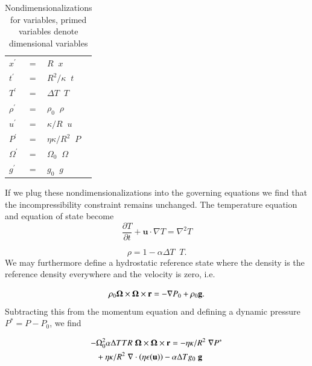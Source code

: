 \documentclass[preprint,12pt,authoryear]{elsarticle}
\newcommand{\mitbf}[1]{\hbox{\mathversion{bold}$#1$}}
\begin{document}
\begin{table}
\centering
\caption{Nondimensionalizations for variables, primed variables denote dimensional variables}
\label{tab:nondim_convert}
\begin{tabular}{@{}lll}
$x^\prime$ &=& $R \;\; x$ \\
$t^\prime$ &=& $R^2/\kappa \;\; t$ \\
$T^\prime$ &=& $\Delta T \;\; T$ \\
$\rho^\prime$ &=& $\rho_0 \;\; \rho$\\
$u^\prime$ &=& $\kappa/R \;\; u$ \\
$P^\prime$ &=& $\eta \kappa/R^2 \;\; P$ \\
$\Omega^\prime$ &=& $\Omega_0 \;\; \Omega$ \\
$g^\prime$ &=& $g_0 \;\; g$
\end{tabular}
\end{table}

If we plug these nondimensionalizations into the governing equations we find that the incompressibility constraint remains unchanged.  
The temperature equation and equation of state become
\begin{equation}
\frac{\partial T}{\partial t} + \mathbf{u} \cdot \nabla T = \nabla^2 T
\end{equation}

\begin{equation}
\rho = 1 - \alpha \Delta T \;\;  T.
\end{equation}
We may furthermore define a hydrostatic reference state where the density is the reference density everywhere and the velocity is zero, i.e.

\begin{equation}
 \rho_0 \mitbf{\Omega} \times \mitbf{\Omega} \times \mathbf{r}= - \nabla P_0 + \rho_0 \mathbf{g}.
\end{equation}
Subtracting this from the momentum equation and defining a dynamic pressure $P^* = P - P_0$, we find

\begin{equation}
\begin{aligned}
 - & \Omega_0^2  \alpha  \Delta T T R \; \mitbf{\Omega} \times \mitbf{\Omega} \times \mathbf{r} = - \eta \kappa / R^2 \; \nabla P^* \\ 
&+ \eta \kappa / R^2 \; \nabla \cdot \left( \eta \epsilon (\mathbf{u}) \right) - \alpha \Delta T g_0 \; \mathbf{g}
\end{aligned}
\end{equation}
\end{document}
